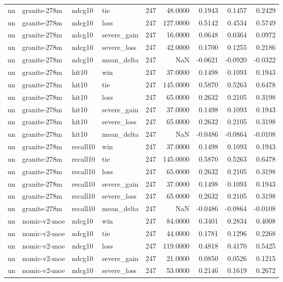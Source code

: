 \begin{tabular}{llllrrrrr}
un & granite-278m & ndcg10 & tie & 247 & 48.0000 & 0.1943 & 0.1457 & 0.2429 \\
un & granite-278m & ndcg10 & loss & 247 & 127.0000 & 0.5142 & 0.4534 & 0.5749 \\
un & granite-278m & ndcg10 & severe\_gain & 247 & 16.0000 & 0.0648 & 0.0364 & 0.0972 \\
un & granite-278m & ndcg10 & severe\_loss & 247 & 42.0000 & 0.1700 & 0.1255 & 0.2186 \\
un & granite-278m & ndcg10 & mean\_delta & 247 & NaN & -0.0621 & -0.0920 & -0.0322 \\
un & granite-278m & hit10 & win & 247 & 37.0000 & 0.1498 & 0.1093 & 0.1943 \\
un & granite-278m & hit10 & tie & 247 & 145.0000 & 0.5870 & 0.5263 & 0.6478 \\
un & granite-278m & hit10 & loss & 247 & 65.0000 & 0.2632 & 0.2105 & 0.3198 \\
un & granite-278m & hit10 & severe\_gain & 247 & 37.0000 & 0.1498 & 0.1093 & 0.1943 \\
un & granite-278m & hit10 & severe\_loss & 247 & 65.0000 & 0.2632 & 0.2105 & 0.3198 \\
un & granite-278m & hit10 & mean\_delta & 247 & NaN & -0.0486 & -0.0864 & -0.0108 \\
un & granite-278m & recall10 & win & 247 & 37.0000 & 0.1498 & 0.1093 & 0.1943 \\
un & granite-278m & recall10 & tie & 247 & 145.0000 & 0.5870 & 0.5263 & 0.6478 \\
un & granite-278m & recall10 & loss & 247 & 65.0000 & 0.2632 & 0.2105 & 0.3198 \\
un & granite-278m & recall10 & severe\_gain & 247 & 37.0000 & 0.1498 & 0.1093 & 0.1943 \\
un & granite-278m & recall10 & severe\_loss & 247 & 65.0000 & 0.2632 & 0.2105 & 0.3198 \\
un & granite-278m & recall10 & mean\_delta & 247 & NaN & -0.0486 & -0.0864 & -0.0108 \\
un & nomic-v2-moe & ndcg10 & win & 247 & 84.0000 & 0.3401 & 0.2834 & 0.4008 \\
un & nomic-v2-moe & ndcg10 & tie & 247 & 44.0000 & 0.1781 & 0.1296 & 0.2268 \\
un & nomic-v2-moe & ndcg10 & loss & 247 & 119.0000 & 0.4818 & 0.4170 & 0.5425 \\
un & nomic-v2-moe & ndcg10 & severe\_gain & 247 & 21.0000 & 0.0850 & 0.0526 & 0.1215 \\
un & nomic-v2-moe & ndcg10 & severe\_loss & 247 & 53.0000 & 0.2146 & 0.1619 & 0.2672 \\

\end{tabular}
